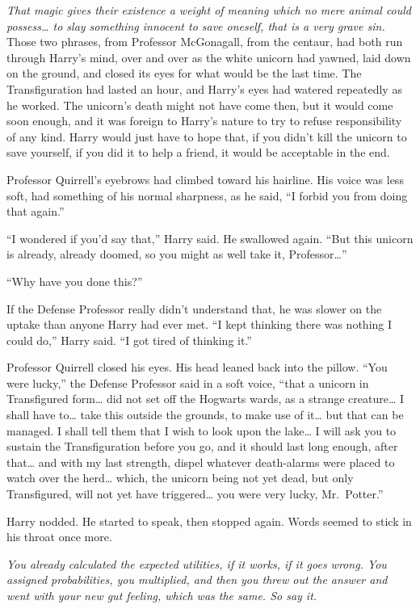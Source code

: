 \emph{That magic gives their existence a weight of meaning which no mere
animal could possess\ldots{} to slay something innocent to save oneself,
that is a very grave sin.} Those two phrases, from Professor McGonagall,
from the centaur, had both run through Harry's mind, over and over as
the white unicorn had yawned, laid down on the ground, and closed its
eyes for what would be the last time. The Transfiguration had lasted an
hour, and Harry's eyes had watered repeatedly as he worked. The
unicorn's death might not have come then, but it would come soon enough,
and it was foreign to Harry's nature to try to refuse responsibility of
any kind. Harry would just have to hope that, if you didn't kill the
unicorn to save yourself, if you did it to help a friend, it would be
acceptable in the end.

Professor Quirrell's eyebrows had climbed toward his hairline. His voice
was less soft, had something of his normal sharpness, as he said, ``I
forbid you from doing that again.''

``I wondered if you'd say that,'' Harry said. He swallowed again. ``But
this unicorn is already, already doomed, so you might as well take it,
Professor\ldots{}''

``Why have you done this?''

If the Defense Professor really didn't understand that, he was slower on
the uptake than anyone Harry had ever met. ``I kept thinking there was
nothing I could do,'' Harry said. ``I got tired of thinking it.''

Professor Quirrell closed his eyes. His head leaned back into the
pillow. ``You were lucky,'' the Defense Professor said in a soft voice,
``that a unicorn in Transfigured form\ldots{} did not set off the
Hogwarts wards, as a strange creature\ldots{} I shall have to\ldots{}
take this outside the grounds, to make use of it\ldots{} but that can be
managed. I shall tell them that I wish to look upon the lake\ldots{} I
will ask you to sustain the Transfiguration before you go, and it should
last long enough, after that\ldots{} and with my last strength, dispel
whatever death-alarms were placed to watch over the herd\ldots{} which,
the unicorn being not yet dead, but only Transfigured, will not yet have
triggered\ldots{} you were very lucky, Mr.~Potter.''

Harry nodded. He started to speak, then stopped again. Words seemed to
stick in his throat once more.

\emph{You already calculated the expected utilities, if it works, if it
goes wrong. You assigned probabilities, you multiplied, and then you
threw out the answer and went with your new gut feeling, which was the
same. So say it.}

